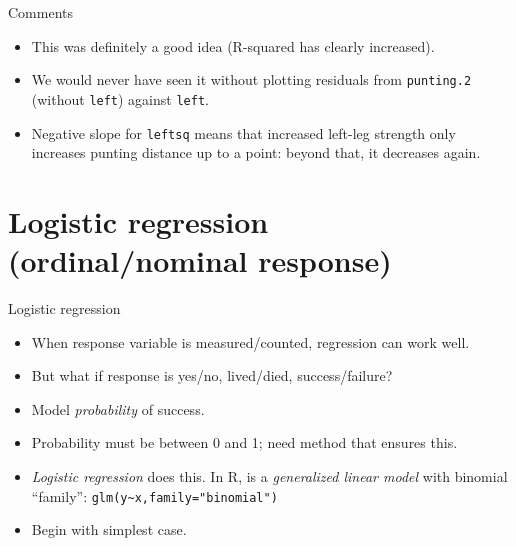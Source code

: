 \documentclass[unknownkeysallowed]{beamer}\usepackage[]{graphicx}\usepackage[]{color}
\begin{document}
\begin{frame}[fragile]{Comments}
  
\begin{itemize}
\item This was definitely a good idea (R-squared has clearly increased).
\item We would never have seen it without plotting residuals from
  \texttt{punting.2} (without \texttt{left}) against \texttt{left}.
\item Negative slope for \texttt{leftsq} means that increased left-leg
  strength only increases punting distance up to a point: beyond that,
  it decreases again.
\end{itemize}
  

  
\end{frame}



\section{Logistic regression (ordinal/nominal response)}
\frame{\sectionpage}


\begin{frame}{Logistic regression}

  \begin{itemize}
  \item When response variable is measured/counted, regression can work well.
  \item But what if response is yes/no, lived/died, success/failure?
  \item Model {\em probability} of success.
  \item Probability must be between 0 and 1; need method that ensures this.
  \item {\em Logistic regression} does this. In R, is a
    \emph{generalized linear model} with binomial ``family'': 
\texttt{glm(y\textasciitilde x,family="binomial")}
    
  \item Begin with simplest case.
    
  \end{itemize}
  
\end{frame}
\end{document}

